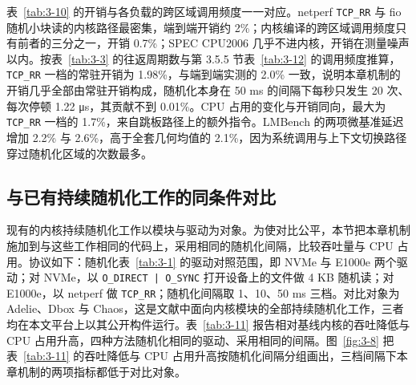 表~\ref{tab:3-10} 的开销与各负载的跨区域调用频度一一对应。netperf \lstinline[breaklines=false]@TCP_RR@ 与 fio 随机小块读的内核路径最密集，端到端开销约 2\%；内核编译的跨区域调用频度只有前者的三分之一，开销 0.7\%；SPEC CPU2006 几乎不进内核，开销在测量噪声以内。按表~\ref{tab:3-3} 的往返周期数与第 3.5.5 节表~\ref{tab:3-12} 的调用频度推算，\lstinline[breaklines=false]@TCP_RR@ 一档的常驻开销为 1.98\%，与端到端实测的 2.0\% 一致，说明本章机制的开销几乎全部由常驻开销构成，随机化本身在 50 ms 的间隔下每秒只发生 20 次、每次停顿 1.22 μs，其贡献不到 0.01\%。CPU 占用的变化与开销同向，最大为 \lstinline[breaklines=false]@TCP_RR@ 一档的 1.7\%，来自跳板路径上的额外指令。LMBench 的两项微基准延迟增加 2.2\% 与 2.6\%，高于全套几何均值的 2.1\%，因为系统调用与上下文切换路径穿过随机化区域的次数最多。

\subsection{与已有持续随机化工作的同条件对比}

现有的内核持续随机化工作以模块与驱动为对象。为使对比公平，本节把本章机制施加到与这些工作相同的代码上，采用相同的随机化间隔，比较吞吐量与 CPU 占用。协议如下：随机化表~\ref{tab:3-1} 的驱动对照范围，即 NVMe 与 E1000e 两个驱动；对 NVMe，以 \lstinline[breaklines=false]@O_DIRECT | O_SYNC@ 打开设备上的文件做 4 KB 随机读；对 E1000e，以 netperf 做 \lstinline[breaklines=false]@TCP_RR@；随机化间隔取 1、10、50 ms 三档。对比对象为 Adelie、Dbox\citep{li2024dbox} 与 Chaos\citep{chang2024chaos}，这是文献中面向内核模块的全部持续随机化工作，三者均在本文平台上以其公开构件运行。表~\ref{tab:3-11} 报告相对基线内核的吞吐降低与 CPU 占用升高，四种方法随机化相同的驱动、采用相同的间隔。图~\ref{fig:3-8} 把表~\ref{tab:3-11} 的吞吐降低与 CPU 占用升高按随机化间隔分组画出，三档间隔下本章机制的两项指标都低于对比对象。

